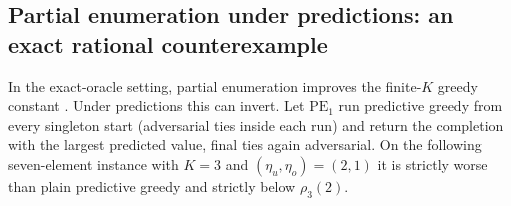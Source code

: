 \subsection{Partial enumeration under predictions: an exact rational
counterexample}\label{app:pe}
In the exact-oracle setting, partial enumeration improves the finite-$K$
greedy constant \citep[Section~7, Theorem~7.1]{nemhauser1978analysis}.
Under predictions this can invert.  Let $\mathrm{PE}_1$ run predictive
greedy from every singleton start (adversarial ties inside each run) and
return the completion with the largest predicted value, final ties again
adversarial.  On the following seven-element instance with $K=3$ and
$(\eta_u,\eta_o)=(2,1)$ it is strictly worse than plain predictive greedy
and strictly below $\rho_3(2)$.

